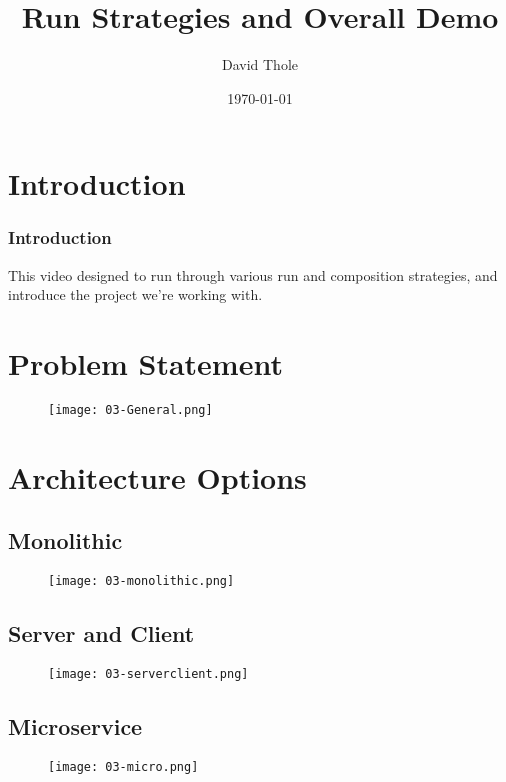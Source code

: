 \documentclass{beamer}
\begin{document}
\title{Run Strategies and Overall Demo}
\author{David Thole}
\date{\today} 
\begin{frame}
  \titlepage
\end{frame}

\section{Introduction}
\begin{frame}\frametitle{Introduction}
  This video designed to run through various run and composition strategies, and introduce the project we're working with.
\end{frame}
\section{Problem Statement}
\begin{frame}
  \begin{figure}
    \texttt{[image: 03-General.png]}
  \end{figure}
\end{frame}
\section{Architecture Options}
\subsection{Monolithic}
\begin{frame}
  \begin{figure}
    \texttt{[image: 03-monolithic.png]}
  \end{figure}
\end{frame}
\subsection{Server and Client}
\begin{frame}
  \begin{figure}
    \texttt{[image: 03-serverclient.png]}
  \end{figure}
\end{frame}
\subsection{Microservice}
\begin{frame}
  \begin{figure}
    \texttt{[image: 03-micro.png]}
  \end{figure}
\end{frame}
\end{document}
